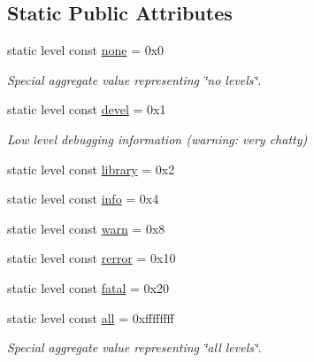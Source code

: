 \subsection*{Static Public Attributes}
\begin{DoxyCompactItemize}
\item 
\mbox{\label{structwebsocketpp_1_1log_1_1elevel_ae86395aa26ec2089e07fd63b62a549fa}} 
static level const \mbox{\hyperlink{structwebsocketpp_1_1log_1_1elevel_ae86395aa26ec2089e07fd63b62a549fa}{none}} = 0x0
\begin{DoxyCompactList}\small\item\em Special aggregate value representing \char`\"{}no levels\char`\"{}. \end{DoxyCompactList}\item 
\mbox{\label{structwebsocketpp_1_1log_1_1elevel_a0b1dbc650c6f2711522c096496423726}} 
static level const \mbox{\hyperlink{structwebsocketpp_1_1log_1_1elevel_a0b1dbc650c6f2711522c096496423726}{devel}} = 0x1
\begin{DoxyCompactList}\small\item\em Low level debugging information (warning\+: very chatty) \end{DoxyCompactList}\item 
static level const \mbox{\hyperlink{structwebsocketpp_1_1log_1_1elevel_a2b862d4f143d9b77619ddbacd1763674}{library}} = 0x2
\item 
static level const \mbox{\hyperlink{structwebsocketpp_1_1log_1_1elevel_a3ab47987a682f0de7b1d0df8c9c3b9d2}{info}} = 0x4
\item 
static level const \mbox{\hyperlink{structwebsocketpp_1_1log_1_1elevel_aef51fd791400121297f38f4381edaebe}{warn}} = 0x8
\item 
static level const \mbox{\hyperlink{structwebsocketpp_1_1log_1_1elevel_ae8a9a9f8b1fa45a731acd340e10aa342}{rerror}} = 0x10
\item 
static level const \mbox{\hyperlink{structwebsocketpp_1_1log_1_1elevel_aa909808e0fb142742a0ebd2dca54f517}{fatal}} = 0x20
\item 
\mbox{\label{structwebsocketpp_1_1log_1_1elevel_a9b31ff708c221d314f9f4eb3ff2b1ad7}} 
static level const \mbox{\hyperlink{structwebsocketpp_1_1log_1_1elevel_a9b31ff708c221d314f9f4eb3ff2b1ad7}{all}} = 0xffffffff
\begin{DoxyCompactList}\small\item\em Special aggregate value representing \char`\"{}all levels\char`\"{}. \end{DoxyCompactList}\end{DoxyCompactItemize}


